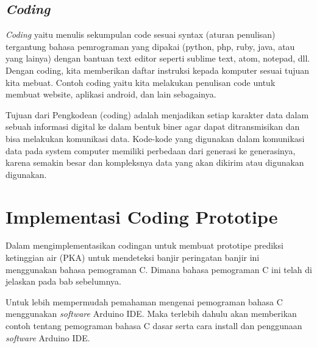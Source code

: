 \subsection{\textit{Coding}}
\par  \textit{Coding} yaitu menulis sekumpulan code sesuai syntax (aturan penulisan) tergantung bahasa pemrograman yang dipakai (python, php, ruby, java, atau yang lainya) dengan bantuan text editor seperti sublime text, atom, notepad, dll. Dengan coding, kita memberikan daftar instruksi kepada komputer sesuai tujuan kita mebuat. Contoh coding yaitu kita melakukan penulisan code untuk membuat website, aplikasi android, dan lain sebagainya.\\

\par Tujuan dari Pengkodean (coding) adalah menjadikan setiap karakter data dalam sebuah informasi digital ke dalam bentuk biner agar dapat ditransmisikan dan bisa melakukan komunikasi data.
Kode-kode yang digunakan dalam komunikasi data pada system computer memiliki perbedaan dari generasi ke generasinya, karena semakin besar dan kompleksnya data yang akan dikirim atau digunakan digunakan.

\section{Implementasi Coding Prototipe}
\par Dalam mengimplementasikan codingan untuk membuat prototipe prediksi ketinggian air (PKA) untuk mendeteksi banjir peringatan banjir ini menggunakan bahasa pemograman C. Dimana bahasa pemograman C ini telah di jelaskan pada bab sebelumnya.\\

\par Untuk lebih mempermudah pemahaman mengenai pemograman bahasa C menggunakan \textit{software} Arduino IDE. Maka terlebih dahulu akan memberikan contoh tentang pemograman bahasa C dasar serta cara install dan penggunaan \textit{software} Arduino IDE.

